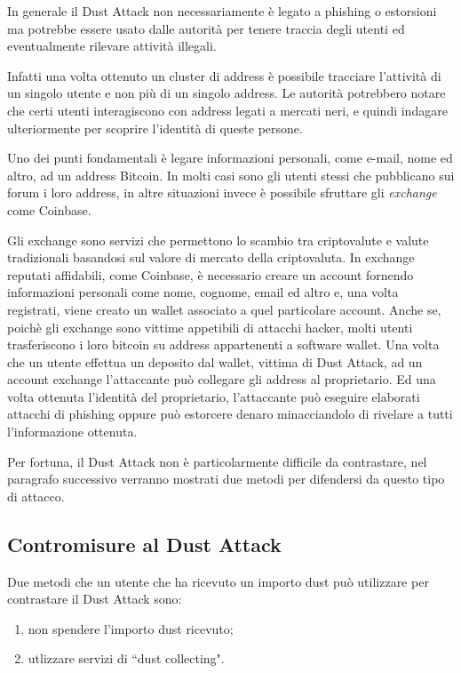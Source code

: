 In generale il Dust Attack non necessariamente è legato a phishing o estorsioni ma potrebbe essere usato dalle autorità per tenere traccia degli utenti ed eventualmente rilevare attività illegali.

Infatti una volta ottenuto un cluster di address è possibile tracciare l'attività di un singolo utente e non più di un singolo address. Le autorità potrebbero notare che certi utenti interagiscono con address legati a mercati neri, e quindi indagare ulteriormente per scoprire l'identità di queste persone.

Uno dei punti fondamentali è legare informazioni personali, come e-mail, nome ed altro, ad un address Bitcoin. In molti casi sono gli utenti stessi che pubblicano sui forum i loro address, in altre situazioni invece è possibile sfruttare gli \emph{exchange} come Coinbase.

Gli exchange sono servizi che permettono lo scambio tra criptovalute e valute tradizionali basandosi sul valore di mercato della criptovaluta. In exchange reputati affidabili, come Coinbase, è necessario creare un account fornendo informazioni personali come nome, cognome, email ed altro e, una volta registrati, viene creato un wallet associato a quel particolare account. Anche se, poichè gli exchange sono vittime appetibili di attacchi hacker, molti utenti trasferiscono i loro bitcoin su address appartenenti a software wallet. Una volta che un utente effettua un deposito dal wallet, vittima di Dust Attack, ad un account exchange l'attaccante può collegare gli address al proprietario. Ed una volta ottenuta l'identità del proprietario, l'attaccante può eseguire elaborati attacchi di phishing oppure può estorcere denaro minacciandolo di rivelare a tutti l'informazione ottenuta. 

Per fortuna, il Dust Attack non è particolarmente difficile da contrastare, nel paragrafo successivo verranno mostrati due metodi per difendersi da questo tipo di attacco.

\subsection{Contromisure al Dust Attack}

Due metodi che un utente che ha ricevuto un importo dust può utilizzare per contrastare il Dust Attack sono:
    \begin{enumerate}
        \item non spendere l'importo dust ricevuto; 
        \item utlizzare servizi di ``dust collecting". 
    \end{enumerate}
    
